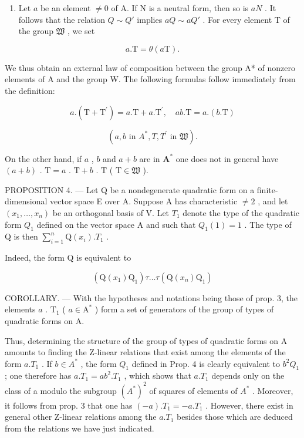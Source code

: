 \begin{enumerate}
\def\labelenumi{\arabic{enumi})}
\setcounter{enumi}{2}
\tightlist
\item
  Let \(a\) be an element \(\neq 0\) of A. If N is a neutral form, then so is \(aN\) . It follows that the relation \(Q \sim Q'\) implies \(aQ \sim aQ'\) . For every element T of the group \(\mathfrak{W}\) , we set
\end{enumerate}

\[
a. \mathrm{T} = \theta (a \mathrm{T}).\tag{3}
\]

We thus obtain an external law of composition between the group A* of nonzero elements of A and the group W. The following formulas follow immediately from the definition:

\[
a. (\mathrm{T} + \mathrm{T} ^ {\prime}) = a. \mathrm{T} + a. \mathrm{T} ^ {\prime}, \quad a b. \mathrm{T} = a. (b. \mathrm{T})\tag{4}
\]

\[
(a, b \text {   in   } A ^ {*}, T, T ^ {\prime} \text {   in   } \mathfrak {W}).
\]

On the other hand, if \(a\) , \(b\) and \(a + b\) are in \(\mathbf{A}^*\) one does not in general have \((a + b)\) . \(\mathrm{T} = a\) . \(\mathrm{T} + b\) . \(\mathrm{T}\) ( \(\mathrm{T} \in \mathfrak{W}\) ).

PROPOSITION 4. --- Let Q be a nondegenerate quadratic form on a finite-dimensional vector space E over A. Suppose A has characteristic \(\neq 2\) , and let \((x_{1},\ldots,x_{n})\) be an orthogonal basis of V. Let \(T_{1}\) denote the type of the quadratic form \(Q_{1}\) defined on the vector space A and such that \(Q_{1}(1)=1\) . The type of Q is then \(\sum_{i=1}^{n}\mathrm{Q}(x_{i}).T_{1}\) .

Indeed, the form Q is equivalent to

\[
(\mathrm{Q} (x _ {1}) \mathrm{Q} _ {1}) \tau \dots \tau (\mathrm{Q} (x _ {n}) \mathrm{Q} _ {1})
\]

COROLLARY. --- With the hypotheses and notations being those of prop. 3, the elements \(a\) . \(\mathrm{T}_{1}\) ( \(a \in \mathrm{A}^{*}\) ) form a set of generators of the group of types of quadratic forms on A.

Thus, determining the structure of the group of types of quadratic forms on A amounts to finding the Z-linear relations that exist among the elements of the form \(a.T_{1}\) . If \(b \in A^{*}\) , the form \(Q_{1}\) defined in Prop. 4 is clearly equivalent to \(b^{2}Q_{1}\) ; one therefore has \(a.T_{1} = ab^{2}.T_{1}\) , which shows that \(a.T_{1}\) depends only on the class of a modulo the subgroup \((A^{*})^{2}\) of squares of elements of \(A^{*}\) . Moreover, it follows from prop. 3 that one has \((-a).T_{1} = -a.T_{1}\) . However, there exist in general other Z-linear relations among the \(a.T_{1}\) besides those which are deduced from the relations we have just indicated.

